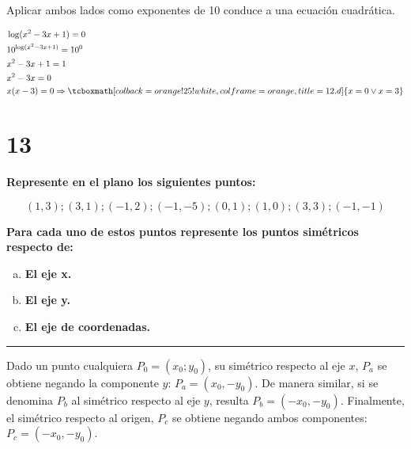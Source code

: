 \documentclass{article}
\newcommand{\hresult}[2]{\tcboxmath[colback=orange!25!white,colframe=orange, title=#1] {#2} }
\begin{document}
Aplicar ambos lados como exponentes de 10 conduce a una ecuación cuadrática.

\begin{subequations}
\begin{align}
& \log(x^2 - 3x + 1) = 0 \\
& 10^{\log(x^2 - 3x + 1)} = 10^0 \\
& x^2 - 3x + 1 = 1 \\
& x^2 - 3x = 0 \\
& x (x-3) = 0 \Rightarrow \hresult{12.d}{ x = 0 \vee x = 3 }
\end{align}
\end{subequations}

\section*{13}
\label{sec:13}

\textbf{Represente en el plano los siguientes puntos:}

\begin{equation}
(1, 3); (3, 1); (-1, 2); (-1, -5); (0, 1); (1, 0); (3, 3); (-1, -1)
\end{equation}

\textbf{Para cada uno de estos puntos represente los puntos simétricos respecto de:}

\begin{enumerate}[(a)]
\bfseries

\item \textbf{El eje x.}

\item \textbf{El eje y.}

\item \textbf{El eje de coordenadas.}

\end{enumerate}
\hrule
\vspace{1em}
Dado un punto cualquiera $P_0 = (x_0; y_0)$, su simétrico respecto al eje $x$, $P_a$ se obtiene negando la componente $y$: $P_a = (x_0, -y_0)$. De manera similar, si se denomina $P_b$ al simétrico respecto al eje $y$, resulta $P_b = (-x_0, -y_0)$. Finalmente, el simétrico respecto al origen, $P_c$ se obtiene negando ambos componentes: $P_c = (-x_0, -y_0)$.
\end{document}
